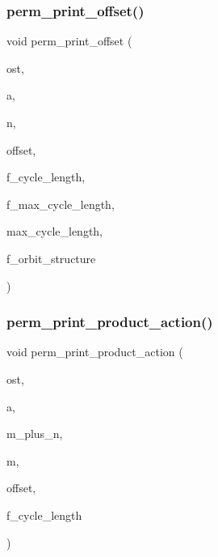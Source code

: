 \subsubsection{\texorpdfstring{perm\+\_\+print\+\_\+offset()}{perm\_print\_offset()}}
{\footnotesize\ttfamily void perm\+\_\+print\+\_\+offset (\begin{DoxyParamCaption}\item[{ostream \&}]{ost,  }\item[{\mbox{\hyperlink{galois_8h_a09fddde158a3a20bd2dcadb609de11dc}{I\+NT}} $\ast$}]{a,  }\item[{\mbox{\hyperlink{galois_8h_a09fddde158a3a20bd2dcadb609de11dc}{I\+NT}}}]{n,  }\item[{\mbox{\hyperlink{galois_8h_a09fddde158a3a20bd2dcadb609de11dc}{I\+NT}}}]{offset,  }\item[{\mbox{\hyperlink{galois_8h_a09fddde158a3a20bd2dcadb609de11dc}{I\+NT}}}]{f\+\_\+cycle\+\_\+length,  }\item[{\mbox{\hyperlink{galois_8h_a09fddde158a3a20bd2dcadb609de11dc}{I\+NT}}}]{f\+\_\+max\+\_\+cycle\+\_\+length,  }\item[{\mbox{\hyperlink{galois_8h_a09fddde158a3a20bd2dcadb609de11dc}{I\+NT}}}]{max\+\_\+cycle\+\_\+length,  }\item[{\mbox{\hyperlink{galois_8h_a09fddde158a3a20bd2dcadb609de11dc}{I\+NT}}}]{f\+\_\+orbit\+\_\+structure }\end{DoxyParamCaption})}

\mbox{\label{combinatorics_8_c_a63cb038187cb0b7a458948f9f80e1410}} 
\subsubsection{\texorpdfstring{perm\+\_\+print\+\_\+product\+\_\+action()}{perm\_print\_product\_action()}}
{\footnotesize\ttfamily void perm\+\_\+print\+\_\+product\+\_\+action (\begin{DoxyParamCaption}\item[{ostream \&}]{ost,  }\item[{\mbox{\hyperlink{galois_8h_a09fddde158a3a20bd2dcadb609de11dc}{I\+NT}} $\ast$}]{a,  }\item[{\mbox{\hyperlink{galois_8h_a09fddde158a3a20bd2dcadb609de11dc}{I\+NT}}}]{m\+\_\+plus\+\_\+n,  }\item[{\mbox{\hyperlink{galois_8h_a09fddde158a3a20bd2dcadb609de11dc}{I\+NT}}}]{m,  }\item[{\mbox{\hyperlink{galois_8h_a09fddde158a3a20bd2dcadb609de11dc}{I\+NT}}}]{offset,  }\item[{\mbox{\hyperlink{galois_8h_a09fddde158a3a20bd2dcadb609de11dc}{I\+NT}}}]{f\+\_\+cycle\+\_\+length }\end{DoxyParamCaption})}

